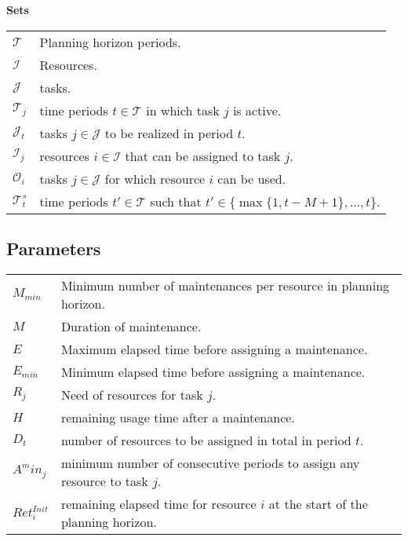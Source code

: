 \documentclass[a4paper,11pt]{article}
\begin{document}
    \textbf{Sets}

    \begin{tabular}{ll}
        $\mathcal{T}$       & Planning horizon periods. \\
        $\mathcal{I}$       & Resources. \\
        $\mathcal{J}$       & tasks.  \\
        $\mathcal{T}_j$     &  time periods $t \in \mathcal{T}$ in which task $j$ is active. \\
        $\mathcal{J}_t$     &  tasks $j \in \mathcal{J}$ to be realized in period $t$. \\
        $\mathcal{I}_j$     &  resources $i \in \mathcal{I}$ that can be assigned to task $j$. \\
        $\mathcal{O}_i$     &  tasks $j \in \mathcal{J}$ for which resource $i$ can be used. \\
        $\mathcal{T}^{s}_t$ &  time periods $t' \in \mathcal{T}$ such that $t' \in \{ \max{\{1, t - M+1\}},  ..., {t}$\}. \\
    \end{tabular}

    \subsection{Parameters}

    \begin{tabular}{ll}
        $M_{min}$        & Minimum number of maintenances per resource in planning horizon. \\
        $M$              & Duration of maintenance. \\
        $E$              & Maximum elapsed time before assigning a maintenance. \\
        $E_{min}$        & Minimum elapsed time before assigning a maintenance. \\
        $R_{j}$          & Need of resources for task $j$. \\
        $H$              & remaining usage time after a maintenance. \\
        $D_t$            & number of resources to be assigned in total in period $t$. \\
        $A^min_j$        & minimum number of consecutive periods to assign any resource to task $j$. \\
        $Ret^{Init}_{i}$ & remaining elapsed time for resource $i$ at the start of the planning horizon. \\
    \end{tabular}
\end{document}
